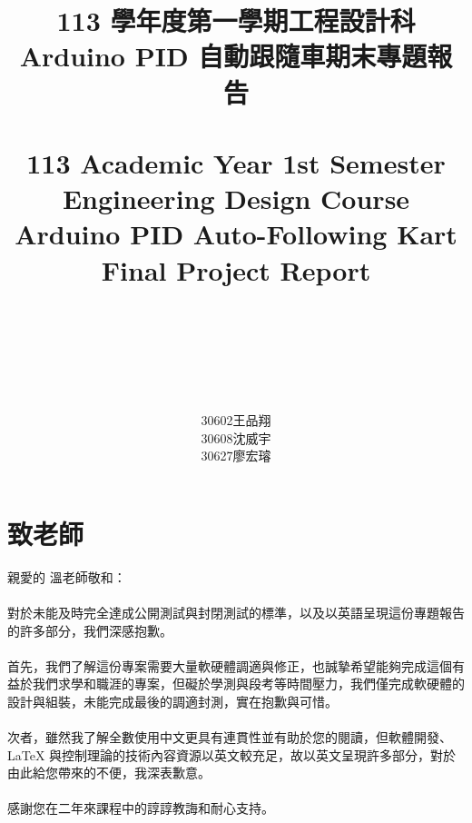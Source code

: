 \documentclass[a4paper,12pt]{article}
\begin{document}
\title{
\Large 113 學年度第一學期工程設計科\\
\LARGE Arduino PID 自動跟隨車期末專題報告\\\mbox{}\\
\Large 113 Academic Year 1st Semester Engineering Design Course\\
\LARGE Arduino PID Auto-Following Kart Final Project Report
\mbox{}\\\mbox{}\\\mbox{}\\\mbox{}\\
}
\author{30602王品翔\\30608沈威宇\\30627廖宏璿}
\date{\temtoday}
\titletocdoc
\section{致老師}
親愛的 溫老師敬和：\\\\
對於未能及時完全達成公開測試與封閉測試的標準，以及以英語呈現這份專題報告的許多部分，我們深感抱歉。\\\\
首先，我們了解這份專案需要大量軟硬體調適與修正，也誠摯希望能夠完成這個有益於我們求學和職涯的專案，但礙於學測與段考等時間壓力，我們僅完成軟硬體的設計與組裝，未能完成最後的調適封測，實在抱歉與可惜。\\\\
次者，雖然我了解全數使用中文更具有連貫性並有助於您的閱讀，但軟體開發、\LaTeX{} 與控制理論的技術內容資源以英文較充足，故以英文呈現許多部分，對於由此給您帶來的不便，我深表歉意。\\\\
感謝您在二年來課程中的諄諄教誨和耐心支持。
\end{document}
